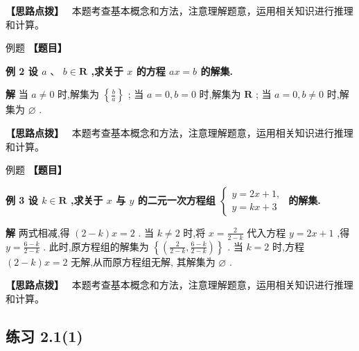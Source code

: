 \documentclass[a4paper,10pt,oneside,fontset=none]{ctexbook}
\newcounter{example}[chapter]
\newenvironment{example}[1][]{\begin{exBox}{例题}{#1}}{\end{exBox}}
\numberwithin{equation}{chapter}
\newenvironment{solution}{\begin{solutionBox}}{\end{solutionBox}}
\newenvironment{hint}{\begin{hintBox}\textbf{【思路点拨】}~}{\end{hintBox}}
\begin{document}
\begin{hint}
本题考查基本概念和方法，注意理解题意，运用相关知识进行推理和计算。
\end{hint}

\begin{example}
\textbf{【题目】}\par\vspace{0.3em}
\textbf{例 2 设 $a\text{ 、 }b \in  \mathbf{R}$ ,求关于 $x$ 的方程 ${ax} = b$ 的解集.}\par\vspace{0.3em}
\end{example}

\begin{solution}
\textbf{解}
当 $a \neq  0$ 时,解集为 $\left\{  \frac{b}{a}\right\}$ ;
当 $a = 0, b = 0$ 时,解集为 $\mathbf{R}$ ;
当 $a = 0, b \neq  0$ 时,解集为 $\varnothing$ .
\end{solution}

\begin{hint}
本题考查基本概念和方法，注意理解题意，运用相关知识进行推理和计算。
\end{hint}

\begin{example}
\textbf{【题目】}\par\vspace{0.3em}
\textbf{例 3 设 $k \in  \mathbf{R}$ ,求关于 $x$ 与 $y$ 的二元一次方程组 $\left\{  \begin{array}{l} y = {2x} + 1, \\  y = {kx} + 3 \end{array}\right.$ 的解集.}\par\vspace{0.3em}
\end{example}

\begin{solution}
\textbf{解}
两式相减,得 $\left( {2 - k}\right) x = 2$ .
当 $k \neq  2$ 时,将 $x = \frac{2}{2 - k}$ 代入方程 $y = {2x} + 1$ ,得 $y = \frac{6 - k}{2 - k}$ . 此时,原方程组的解集为 $\left\{  \left( {\frac{2}{2 - k},\frac{6 - k}{2 - k}}\right) \right\}$ .
当 $k = 2$ 时,方程 $\left( {2 - k}\right) x = 2$ 无解,从而原方程组无解, 其解集为 $\varnothing$ .
\end{solution}

\begin{hint}
本题考查基本概念和方法，注意理解题意，运用相关知识进行推理和计算。
\end{hint}

\subsection*{练习 2.1(1)}
\end{document}
